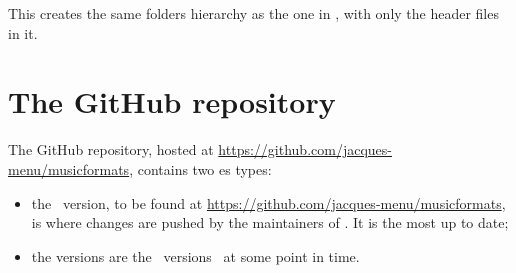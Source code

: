 This creates the same folders hierarchy as the one in \srcFolder, with only the  header files in it.


\section{The GitHub repository}

The GitHub repository, hosted at \url{https://github.com/jacques-menu/musicformats}, contains two \branch es types:
\begin{itemize}
\item the  \master\ version, to be found at \url{https://github.com/jacques-menu/musicformats}, is where changes are pushed by the maintainers of \mf. It is the most up to date;
\item the  versions are the \master\ versions \frozen\ at some point in time.
\end{itemize}
